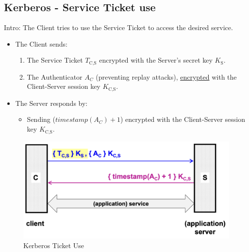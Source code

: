 \subsection*{Kerberos - Service Ticket use}

Intro: The Client tries to use the Service Ticket to access the desired service.


\begin{multicols}{2}
    \begin{itemize}
        \item The Client sends:
        \begin{enumerate}
            \item The Service Ticket $T_{\text{C,S}}$ encrypted with the Server's secret key $K_{\text{S}}$.
            \item The Authenticator $A_C$ (preventing replay attacks), \underline{encrypted} with the Client-Server session key $K_{\text{C,S}}$.
        \end{enumerate}
        \item The Server responds by:
        \begin{itemize}
            \item Sending ($timestamp(A_C) + 1$) encrypted with the Client-Server session key $K_{\text{C,S}}$.
        \end{itemize}
    \end{itemize}

\columnbreak

\begin{figure}[H]
    \centering
    \includegraphics[width=\linewidth]{Images/Authentication/kerticketuse.png}
    \caption{Kerberos Ticket Use}
\end{figure}
\end{multicols}

